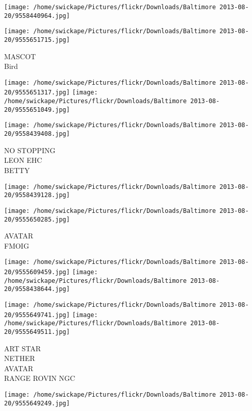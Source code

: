 \documentclass[10pt,letterpaper]{article}
\begin{document}
\texttt{[image: /home/swickape/Pictures/flickr/Downloads/Baltimore 2013-08-20/9558440964.jpg]}

\vspace{0.25in}
\texttt{[image: /home/swickape/Pictures/flickr/Downloads/Baltimore 2013-08-20/9555651715.jpg]}

MASCOT\\
Bird\\
\pagebreak

\texttt{[image: /home/swickape/Pictures/flickr/Downloads/Baltimore 2013-08-20/9555651317.jpg]}
\texttt{[image: /home/swickape/Pictures/flickr/Downloads/Baltimore 2013-08-20/9555651049.jpg]}

\vspace{0.25in}
\texttt{[image: /home/swickape/Pictures/flickr/Downloads/Baltimore 2013-08-20/9558439408.jpg]}

NO STOPPING\\
LEON EHC\\
BETTY\\
\pagebreak

\texttt{[image: /home/swickape/Pictures/flickr/Downloads/Baltimore 2013-08-20/9558439128.jpg]}

\vspace{0.25in}
\texttt{[image: /home/swickape/Pictures/flickr/Downloads/Baltimore 2013-08-20/9555650285.jpg]}

AVATAR\\
FMOIG\\
\pagebreak

\texttt{[image: /home/swickape/Pictures/flickr/Downloads/Baltimore 2013-08-20/9555609459.jpg]}
\texttt{[image: /home/swickape/Pictures/flickr/Downloads/Baltimore 2013-08-20/9558438644.jpg]}

\texttt{[image: /home/swickape/Pictures/flickr/Downloads/Baltimore 2013-08-20/9555649741.jpg]}
\texttt{[image: /home/swickape/Pictures/flickr/Downloads/Baltimore 2013-08-20/9555649511.jpg]}

ART STAR\\
NETHER\\
AVATAR\\
RANGE ROVIN NGC\\
\pagebreak

\texttt{[image: /home/swickape/Pictures/flickr/Downloads/Baltimore 2013-08-20/9555649249.jpg]}
\end{document}
